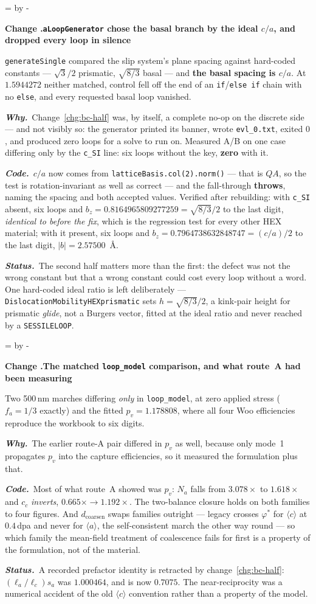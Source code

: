 \documentclass[11pt,a4paper]{article}
\newcommand{\code}[1]{\texttt{\small #1}}
\newcommand{\aloop}{\ensuremath{\langle a\rangle}}
\newcommand{\cloop}{\ensuremath{\langle c\rangle}}
\newcommand{\needlines}[1]{%
  \par\dimen0=\pagegoal \advance\dimen0 by -\pagetotal
  \ifdim\dimen0<#1\baselineskip \newpage \fi}
\newcounter{chg}
\newcommand{\change}[1]{%
  \needlines{4}%
  \refstepcounter{chg}%
  \par\medskip\noindent
  {\bfseries\boldmath Change \thechg.\quad #1}%
  \par\nobreak\smallskip}
\newcommand{\why}[1]{\par\noindent\textbf{\itshape Why.}\ #1\par}
\newcommand{\impact}[1]{\par\noindent\textbf{\itshape Code.}\ #1\par}
\newcommand{\status}[1]{\par\noindent\textbf{\itshape Status.}\ #1\par}
\begin{document}
\change{\code{aLoopGenerator} chose the basal branch by the ideal $c/a$, and
dropped every loop in silence}
\label{chg:aloop-silent}
\code{generateSingle} compared the slip system's plane spacing against hard-coded
constants --- $\sqrt3/2$ prismatic, $\sqrt{8/3}$ basal --- and \textbf{the basal
spacing is $c/a$}. At $1.5944272$ neither matched, control fell off the end of an
\code{if}/\code{else if} chain with no \code{else}, and every requested basal loop
vanished.
\why{Change~\ref{chg:bc-half} was, by itself, a complete no-op on the discrete
side --- and not visibly so: the generator printed its banner, wrote
\code{evl\_0.txt}, exited $0$, and produced zero loops for a solve to run on.
Measured A/B on one case differing only by the \code{c\_SI} line: six loops
without the key, \textbf{zero} with it.}
\impact{$c/a$ now comes from \code{latticeBasis.col(2).norm()} --- that is $QA$,
so the test is rotation-invariant as well as correct --- and the fall-through
\textbf{throws}, naming the spacing and both accepted values. Verified after
rebuilding: with \code{c\_SI} absent, six loops and $b_z = 0.8164965809277259 =
\sqrt{8/3}/2$ to the last digit, \emph{identical to before the fix}, which is the
regression test for every other HEX material; with it present, six loops and
$b_z = 0.7964738632848747 = (c/a)/2$ to the last digit, $|b| = 2.57500$~\AA{}.}
\status{The second half matters more than the first: the defect was not the wrong
constant but that a wrong constant could cost every loop without a word. One
hard-coded ideal ratio is left deliberately ---
\code{DislocationMobilityHEXprismatic} sets $h = \sqrt{8/3}/2$, a kink-pair height
for prismatic \emph{glide}, not a Burgers vector, fitted at the ideal ratio and
never reached by a \code{SESSILELOOP}.}

\change{The matched \code{loop\_model} comparison, and what route~A had been measuring}
\label{chg:lm-matched}
Two 500\,nm marches differing \emph{only} in \code{loop\_model}, at zero applied
stress ($f_a = 1/3$ exactly) and the fitted $p_v = 1.178808$, where all four Woo
efficiencies reproduce the workbook to six digits.
\why{The earlier route-A pair differed in $p_v$ as well, because only mode~1
propagates $p_v$ into the capture efficiencies, so it measured the formulation
plus that.}
\impact{Most of what route~A showed was $p_v$: $N_a$ falls from $3.078\times$ to
$1.618\times$ and $c_c$ \emph{inverts}, $0.665\times \to 1.192\times$. The
two-balance closure holds on both families to four figures. And
$d_{\text{coarsen}}$ swaps families outright --- legacy crosses $\varphi^\ast$ for
\cloop{} at $0.4$\,dpa and never for \aloop{}, the self-consistent march the other
way round --- so which family the mean-field treatment of coalescence fails for
first is a property of the formulation, not of the material.}
\status{A recorded prefactor identity is retracted by
change~\ref{chg:bc-half}: $(\ell_a/\ell_c)s_a$ was $1.000464$, and is now
$0.7075$. The near-reciprocity was a numerical accident of the old \cloop{}
convention rather than a property of the model.}
\end{document}
